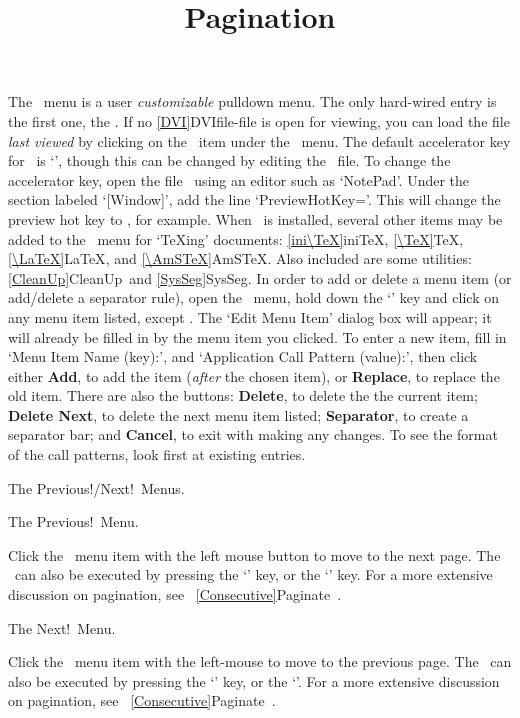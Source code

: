 The \hb{\TeX{}}\ menu is a user {\it customizable\/} pulldown menu. 
The only hard-wired entry is the first one, the .	If
no \ref{DVI}{DVIfile}-file is open for viewing, you can %
load the file {\it last viewed} by clicking on the \ item
under the \hb{\TeX{}}\ menu.  The default accelerator key for
\ is `', though this can be changed by editing
the \ file.  To change the accelerator key, open the
file \ using an editor such as `NotePad'.  Under the
section labeled `[Window]', add the line `PreviewHotKey='.
This will change the preview hot key to , for example.
   \bigskip
When \ is installed, several other items may  be added to
the \hb{\TeX{}}\ menu for `\TeX{}ing' documents: \ref{ini\TeX}{iniTeX},
\ref{\TeX}{TeX}, \ref{\LaTeX}{LaTeX}, and \ref{\AmSTeX}{AmSTeX}.  
Also included are some utilities: \ref{CleanUp}{CleanUp}\ and
\ref{SysSeg}{SysSeg}.
   \bigskip
In order 
to add or delete a menu item (or add/delete a separator rule),
open the \hb{\TeX{}}\ menu, hold down the `' key and click on 
any 
menu item listed, except .  The `Edit Menu Item' dialog box
will appear; it will already be filled in by the menu item you clicked. 
To enter a new item, fill in `Menu Item Name (key):', and  `Application
Call Pattern (value):', then click either {\bf Add}, to add the item
({\it after\/} the chosen item), or {\bf Replace}, to replace the old item.
   \bigskip
There are also the buttons: {\bf Delete}, to delete the the current
item; {\bf Delete Next}, to delete the next menu item listed; {\bf
Separator}, to create a separator bar; and {\bf Cancel}, to exit with
making any changes.
   \bigskip
To see the format of the call patterns, look first at existing entries.

\newpage

\title{Pagination}The Previous!/Next!~Menus.

The Previous!~Menu.

Click the \ menu item with the left mouse button to move
to the next page.  The \ can also be executed by pressing
the `' key, or the `' key.  For a more extensive
discussion on pagination, see 
\ \ref{Consecutive}{Paginate}\ .
   \bigskip

The Next!~Menu.
  
Click the \ menu item with the left-mouse to move to the
previous page.  The \ can also be executed by pressing
the `' key, or the `'.  For a more extensive
discussion on pagination, 
see \ \ref{Consecutive}{Paginate}\ .
   \bigskip

